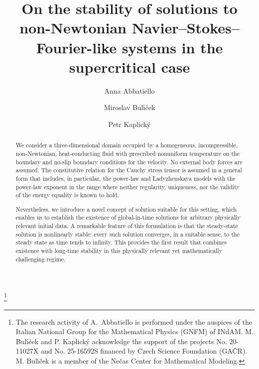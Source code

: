 \documentclass[11pt, a4paper, reqno]{amsart}
\numberwithin{equation}{section}
\begin{document}
\title[Stability of a non-Newtonian Navier-Stokes-Fourier system]{On the stability of solutions to  non-Newtonian Navier--Stokes--Fourier-like systems in the supercritical case}
\author[A.~Abbatiello]{Anna Abbatiello}
\address{Anna Abbatiello.
University of Campania “L. Vanvitelli”, Department of Mathematics and Physics, Viale A. Lincoln 5, 81100 Caserta, Italy. ORCID: https://orcid.org/0000-0001-5758-114X}   



\author[M.~Bul\'{\i}\v{c}ek]{Miroslav Bul\'{\i}\v{c}ek}
\address{Miroslav Bul\'{\i}\v{c}ek. Charles University,  Faculty of Mathematics and Physics, Mathematical Institute, Sokolovsk\'{a} 83, 18675 Prague, Czech Republic. ORCID: https://orcid.org/0000-0003-2380-3458}

\author[P.~Kaplick\'{y}]{Petr Kaplick\'{y}}
\address{Petr Kaplick\'{y}. Charles University, Faculty of Mathematics and Physics, Department of Mathematical Analysis, Sokolovsk\'{a} 83, 18675 Prague, Czech Republic. ORCID: https://orcid.org/0000-0002-1997-859X
}



\thanks{The research activity of A.~Abbatiello is performed under the auspices of the Italian National Group for the Mathematical Physics (GNFM) of INdAM. M. Bul\'{\i}\v{c}ek and P. Kaplick\'{y} acknowledge the support of the projects  No. 20-11027X and No. 25-16592S financed by Czech Science Foundation (GA\v{C}R). M. Bul\'{\i}\v{c}ek is a member of the Ne\v{c}as Center for Mathematical Modeling.}

\begin{abstract}
We consider a three-dimensional domain occupied by a homogeneous, incompressible, non-Newtonian, heat-conducting fluid with prescribed nonuniform temperature on the boundary and no-slip boundary conditions for the velocity. No external body forces are assumed. The constitutive relation for the Cauchy stress tensor is assumed in a general form that includes, in particular, the power-law and Ladyzhenskaya models with the power-law exponent in the range where neither regularity, uniqueness, nor the validity of the energy equality is known to hold.

Nevertheless, we introduce a novel concept of solution suitable for this setting, which enables us to establish the existence of global-in-time solutions for arbitrary physically relevant initial data. A remarkable feature of this formulation is that the steady-state solution is nonlinearly stable: every such solution converges, in a suitable sense, to the steady state as time tends to infinity. This provides the first result that combines existence with long-time stability in this physically relevant yet mathematically challenging regime.
\end{abstract}
\end{document}
